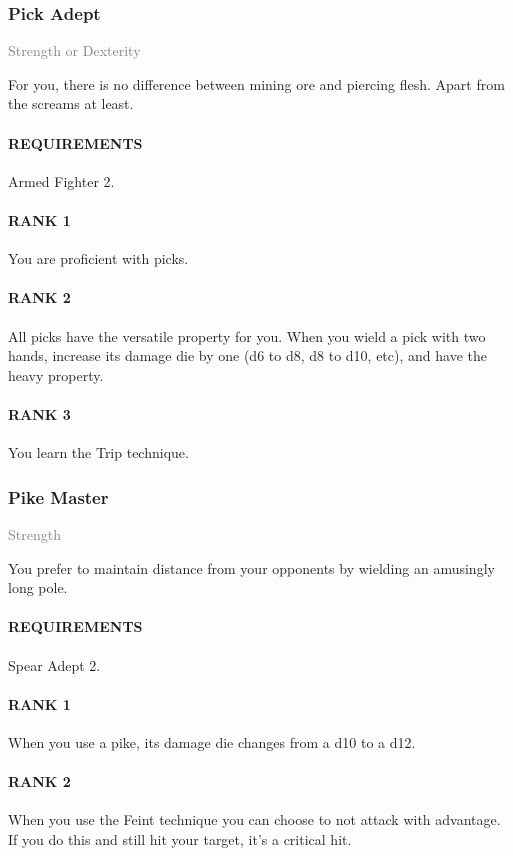 \subsubsection{Pick Adept} \label{feat::pickadept}
\small{\textcolor{gray}{Strength or Dexterity}}

\normalsize
For you, there is no difference between mining ore and piercing flesh.
Apart from the screams at least.
\paragraph{REQUIREMENTS} Armed Fighter 2.
\paragraph{RANK 1} You are proficient with picks.
\paragraph{RANK 2} All picks have the versatile property for you.
When you wield a pick with two hands, increase its damage die by one (d6 to d8, d8 to d10, etc), and have the heavy property.
\paragraph{RANK 3} You learn the Trip technique.

\subsubsection{Pike Master} \label{feat::pikemaster}
\small{\textcolor{gray}{Strength}}

\normalsize
You prefer to maintain distance from your opponents by wielding an amusingly long pole.
\paragraph{REQUIREMENTS} Spear Adept 2.
\paragraph{RANK 1} When you use a pike, its damage die changes from a d10 to a d12.
\paragraph{RANK 2} When you use the Feint technique you can choose to not attack with advantage.
If you do this and still hit your target, it's a critical hit.
